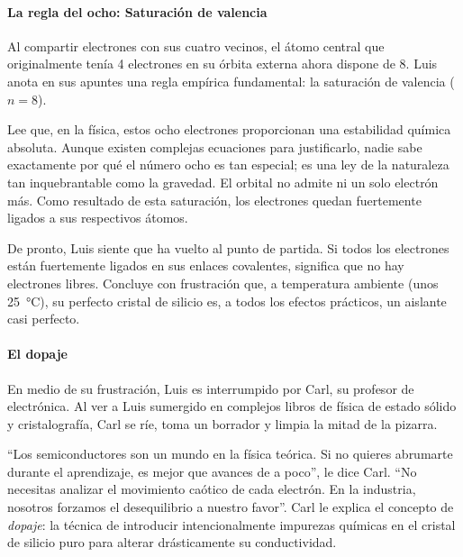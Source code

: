 \paragraph{La regla del ocho: Saturación de valencia}
Al compartir electrones con sus cuatro vecinos, el átomo central que originalmente tenía 4 electrones en su órbita externa ahora dispone de 8. Luis anota en sus apuntes una regla empírica fundamental: la saturación de valencia (\(n=8\)).

Lee que, en la física, estos ocho electrones proporcionan una estabilidad química absoluta. Aunque existen complejas ecuaciones para justificarlo, nadie sabe exactamente por qué el número ocho es tan especial; es una ley de la naturaleza tan inquebrantable como la gravedad. El orbital no admite ni un solo electrón más. Como resultado de esta saturación, los electrones quedan fuertemente ligados a sus respectivos átomos.

De pronto, Luis siente que ha vuelto al punto de partida. Si todos los electrones están fuertemente ligados en sus enlaces covalentes, significa que no hay electrones libres. Concluye con frustración que, a temperatura ambiente (unos \qty{25}{\degreeCelsius}), su perfecto cristal de silicio es, a todos los efectos prácticos, un aislante casi perfecto.

\paragraph{El dopaje}
En medio de su frustración, Luis es interrumpido por Carl, su profesor de electrónica. Al ver a Luis sumergido en complejos libros de física de estado sólido y cristalografía, Carl se ríe, toma un borrador y limpia la mitad de la pizarra. 

``Los semiconductores son un mundo en la física teórica. Si no quieres abrumarte durante el aprendizaje, es mejor que avances de a poco'', le dice Carl. ``No necesitas analizar el movimiento caótico de cada electrón. En la industria, nosotros forzamos el desequilibrio a nuestro favor''. Carl le explica el concepto de \emph{dopaje}: la técnica de introducir intencionalmente impurezas químicas en el cristal de silicio puro para alterar drásticamente su conductividad.

